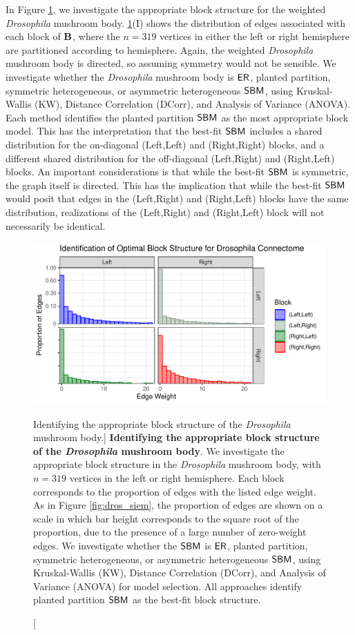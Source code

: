 In Figure \ref{fig:dros_sbm_est}, we investigate the appropriate block structure for the weighted \textit{Drosophila} mushroom body. \ref{fig:dros_sbm_est}(I) shows the distribution of edges associated with each block of $\operatorname{\mathbf{B}}$, where the $n=319$ vertices in either the left or right hemisphere are partitioned according to hemisphere. Again, the weighted \textit{Drosophila} mushroom body is directed, so assuming symmetry would not be sensible. We investigate whether the \textit{Drosophila} mushroom body is $\operatorname{\mathsf{ER}}$, planted partition, symmetric heterogeneous, or asymmetric heterogeneous $\operatorname{\mathsf{SBM}}$, using Kruskal-Wallis (KW), Distance Correlation (DCorr), and Analysis of Variance (ANOVA). Each method identifies the planted partition $\operatorname{\mathsf{SBM}}$ as the most appropriate block model. This has the interpretation that the best-fit $\operatorname{\mathsf{SBM}}$ includes a shared distribution for the on-diagonal (Left,Left) and (Right,Right) blocks, and a different shared distribution for the off-diagonal (Left,Right) and (Right,Left) blocks. An important considerations is that while the best-fit $\operatorname{\mathsf{SBM}}$ is symmetric, the graph itself is directed. This has the implication that while the best-fit $\operatorname{\mathsf{SBM}}$ would posit that edges in the (Left,Right) and (Right,Left) blocks have the same distribution, realizations of the (Left,Right) and (Right,Left) block will not necessarily be identical.

\begin{figure}
    \centering
    \includegraphics[width=.8\linewidth]{figures/dnd/dros_sbm_est.pdf}
    \caption
    [Identifying the appropriate block structure of the \textit{Drosophila} mushroom body.]
    {\textbf{Identifying the appropriate block structure of the \textit{Drosophila} mushroom body}. We investigate the appropriate block structure in the \textit{Drosophila}  mushroom body, with $n=319$ vertices in the left or right hemisphere. Each block corresponds to the proportion of edges with the listed edge weight. As in Figure \ref{fig:dros_siem}, the proportion of edges are shown on a scale in which bar height corresponds to the square root of the proportion, due to the presence of a large number of zero-weight edges. We investigate whether the $\operatorname{\mathsf{SBM}}$ is $\operatorname{\mathsf{ER}}$, planted partition, symmetric heterogeneous, or asymmetric heterogeneous $\operatorname{\mathsf{SBM}}$, using Kruskal-Wallis (KW), Distance Correlation (DCorr), and Analysis of Variance (ANOVA) for model selection. All approaches identify planted partition $\operatorname{\mathsf{SBM}}$ as the best-fit block structure.}
    \label{fig:dros_sbm_est}
\end{figure}


